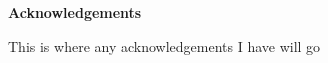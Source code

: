 %
%

\newpage
\thispagestyle{empty}
\begin{center}
{\huge\bfseries Acknowledgements \par}
\end{center}

This is where any acknowledgements I have will go